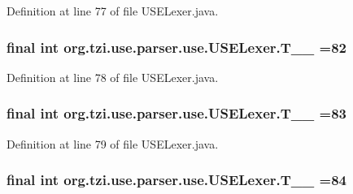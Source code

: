 Definition at line 77 of file U\-S\-E\-Lexer.\-java.

\hypertarget{classorg_1_1tzi_1_1use_1_1parser_1_1use_1_1_u_s_e_lexer_a1657b0a51e2062c9ad5237570206304e}{
\subsubsection[{T\-\_\-\-\_\-82}]{\setlength{\rightskip}{0pt plus 5cm}final int org.\-tzi.\-use.\-parser.\-use.\-U\-S\-E\-Lexer.\-T\-\_\-\-\_ =82\hspace{0.3cm}{\ttfamily [static]}}}\label{classorg_1_1tzi_1_1use_1_1parser_1_1use_1_1_u_s_e_lexer_a1657b0a51e2062c9ad5237570206304e}


Definition at line 78 of file U\-S\-E\-Lexer.\-java.

\hypertarget{classorg_1_1tzi_1_1use_1_1parser_1_1use_1_1_u_s_e_lexer_af65a4057101cb1d7ed921c8ef690656c}{
\subsubsection[{T\-\_\-\-\_\-83}]{\setlength{\rightskip}{0pt plus 5cm}final int org.\-tzi.\-use.\-parser.\-use.\-U\-S\-E\-Lexer.\-T\-\_\-\-\_ =83\hspace{0.3cm}{\ttfamily [static]}}}\label{classorg_1_1tzi_1_1use_1_1parser_1_1use_1_1_u_s_e_lexer_af65a4057101cb1d7ed921c8ef690656c}


Definition at line 79 of file U\-S\-E\-Lexer.\-java.

\hypertarget{classorg_1_1tzi_1_1use_1_1parser_1_1use_1_1_u_s_e_lexer_a00960eb22e9dc889062c7483343817fd}{
\subsubsection[{T\-\_\-\-\_\-84}]{\setlength{\rightskip}{0pt plus 5cm}final int org.\-tzi.\-use.\-parser.\-use.\-U\-S\-E\-Lexer.\-T\-\_\-\-\_ =84\hspace{0.3cm}{\ttfamily [static]}}}\label{classorg_1_1tzi_1_1use_1_1parser_1_1use_1_1_u_s_e_lexer_a00960eb22e9dc889062c7483343817fd}


